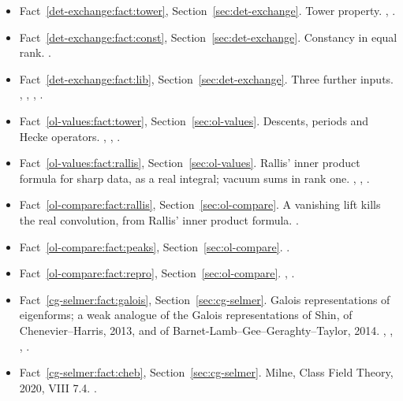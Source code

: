 \begin{itemize}[leftmargin=2em,itemsep=1pt]
\item Fact~\ref{det-exchange:fact:tower}, Section~\ref{sec:det-exchange}. Tower property. , .
\item Fact~\ref{det-exchange:fact:const}, Section~\ref{sec:det-exchange}. Constancy in equal rank. .
\item Fact~\ref{det-exchange:fact:lib}, Section~\ref{sec:det-exchange}. Three further inputs. , , , .
\item Fact~\ref{ol-values:fact:tower}, Section~\ref{sec:ol-values}. Descents, periods and Hecke operators. , , .
\item Fact~\ref{ol-values:fact:rallis}, Section~\ref{sec:ol-values}. Rallis' inner product formula for sharp data, as a real integral; vacuum sums in rank one. , , .
\item Fact~\ref{ol-compare:fact:rallis}, Section~\ref{sec:ol-compare}. A vanishing lift kills the real convolution, from Rallis' inner product formula. .
\item Fact~\ref{ol-compare:fact:peaks}, Section~\ref{sec:ol-compare}. .
\item Fact~\ref{ol-compare:fact:repro}, Section~\ref{sec:ol-compare}. , .
\item Fact~\ref{cg-selmer:fact:galois}, Section~\ref{sec:cg-selmer}. Galois representations of eigenforms; a weak
analogue of the Galois representations of Shin, of Chenevier--Harris, 2013, and of
Barnet-Lamb--Gee--Geraghty--Taylor, 2014. , , , .
\item Fact~\ref{cg-selmer:fact:cheb}, Section~\ref{sec:cg-selmer}. Milne, Class Field Theory, 2020, VIII 7.4. .

\end{itemize}
